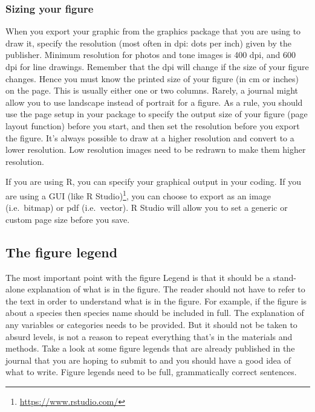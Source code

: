 \documentclass[
]{krantz}
\renewcommand{\href}[2]{#2\footnote{\url{#1}}}
\begin{document}
\hypertarget{sizing-your-figure}{%
\subsubsection{Sizing your figure}\label{sizing-your-figure}}

When you export your graphic from the graphics package that you are using to draw it, specify the resolution (most often in dpi: dots per inch) given by the publisher. Minimum resolution for photos and tone images is 400 dpi, and 600 dpi for line drawings. Remember that the dpi will change if the size of your figure changes. Hence you must know the printed size of your figure (in cm or inches) on the page. This is usually either one or two columns. Rarely, a journal might allow you to use landscape instead of portrait for a figure. As a rule, you should use the page setup in your package to specify the output size of your figure (page layout function) before you start, and then set the resolution before you export the figure. It's always possible to draw at a higher resolution and convert to a lower resolution. Low resolution images need to be redrawn to make them higher resolution.

If you are using R, you can specify your graphical output in your coding. If you are using a GUI \href{https://www.rstudio.com/}{(like R Studio)}, you can choose to export as an image (i.e.~bitmap) or pdf (i.e.~vector). R Studio will allow you to set a generic or custom page size before you save.

\hypertarget{the-figure-legend}{%
\subsection{The figure legend}\label{the-figure-legend}}

The most important point with the figure Legend is that it should be a stand-alone explanation of what is in the figure. The reader should not have to refer to the text in order to understand what is in the figure. For example, if the figure is about a species then species name should be included in full. The explanation of any variables or categories needs to be provided. But it should not be taken to absurd levels, is not a reason to repeat everything that's in the materials and methods. Take a look at some figure legends that are already published in the journal that you are hoping to submit to and you should have a good idea of what to write. Figure legends need to be full, grammatically correct sentences.
\end{document}

